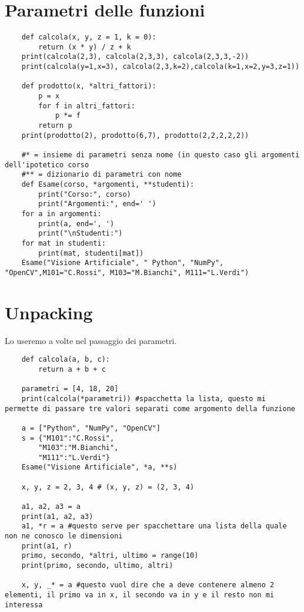 \section{Parametri delle funzioni}

\begin{lstlisting}
	def calcola(x, y, z = 1, k = 0):
		return (x * y) / z + k
	print(calcola(2,3), calcola(2,3,3), calcola(2,3,3,-2))
	print(calcola(y=1,x=3), calcola(2,3,k=2),calcola(k=1,x=2,y=3,z=1))
	
	def prodotto(x, *altri_fattori):
		p = x
		for f in altri_fattori:
			p *= f
		return p
	print(prodotto(2), prodotto(6,7), prodotto(2,2,2,2,2))
	
	#* = insieme di parametri senza nome (in questo caso gli argomenti dell'ipotetico corso
	#** = dizionario di parametri con nome
	def Esame(corso, *argomenti, **studenti):
		print("Corso:", corso)
		print("Argomenti:", end=' ')
	for a in argomenti:
		print(a, end=', ')
		print("\nStudenti:")
	for mat in studenti:
		print(mat, studenti[mat])
	Esame("Visione Artificiale", " Python", "NumPy", "OpenCV",M101="C.Rossi", M103="M.Bianchi", M111="L.Verdi")
\end{lstlisting}

\section{Unpacking}

Lo useremo a volte nel passaggio dei parametri.

\begin{lstlisting}
	def calcola(a, b, c):
		return a + b + c
	
	parametri = [4, 18, 20]
	print(calcola(*parametri)) #spacchetta la lista, questo mi permette di passare tre valori separati come argomento della funzione

	a = ["Python", "NumPy", "OpenCV"]
	s = {"M101":"C.Rossi",
		"M103":"M.Bianchi",
		"M111":"L.Verdi"}
	Esame("Visione Artificiale", *a, **s)

	x, y, z = 2, 3, 4 # (x, y, z) = (2, 3, 4)

	a1, a2, a3 = a
	print(a1, a2, a3)
	a1, *r = a #questo serve per spacchettare una lista della quale non ne conosco le dimensioni
	print(a1, r)
	primo, secondo, *altri, ultimo = range(10)
	print(primo, secondo, ultimo, altri)
	
	x, y, _* = a #questo vuol dire che a deve contenere almeno 2 elementi, il primo va in x, il secondo va in y e il resto non mi interessa
\end{lstlisting}


